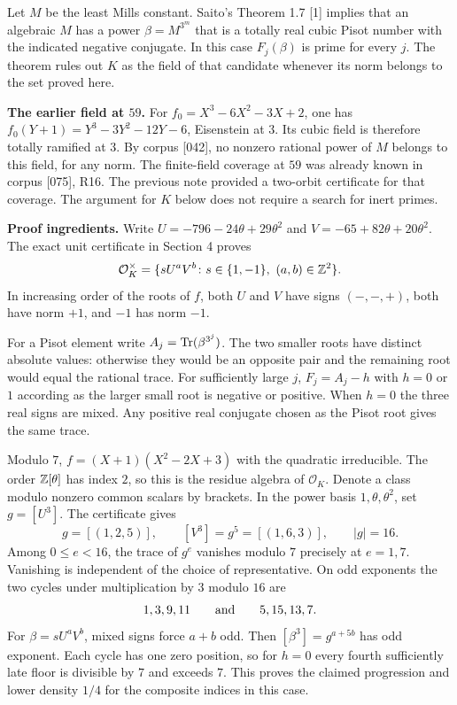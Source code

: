\documentclass[11pt,a4paper,oneside,openany]{book}
\begin{document}
Let $M$ be the least Mills constant. Saito's Theorem 1.7 [1] implies that an algebraic $M$ has a power $\beta=M^{3^m}$ that is a totally real cubic Pisot number with the indicated negative conjugate. In this case $F_j(\beta)$ is prime for every $j$. The theorem rules out $K$ as the field of that candidate whenever its norm belongs to the set proved here.

\textbf{The earlier field at $59$.} For $f_0=X^3-6X^2-3X+2$, one has $f_0(Y+1)=Y^3-3Y^2-12Y-6$, Eisenstein at $3$. Its cubic field is therefore totally ramified at $3$. By corpus [042], no nonzero rational power of $M$ belongs to this field, for any norm. The finite-field coverage at $59$ was already known in corpus [075], R16. The previous note provided a two-orbit certificate for that coverage. The argument for $K$ below does not require a search for inert primes.

\textbf{Proof ingredients.} Write $U=-796-24\theta+29\theta^2$ and $V=-65+82\theta+20\theta^2$. The exact unit certificate in Section 4 proves
\[
 \mathcal O_K^\times=\{sU^aV^b\colon s\in\{1,-1\},\ (a,b)\in\mathbb Z^2\}.
\]
In increasing order of the roots of $f$, both $U$ and $V$ have signs $(-,-,+)$, both have norm $+1$, and $-1$ has norm $-1$.



For a Pisot element write $A_j=\operatorname{Tr}(\beta^{3^j})$. The two smaller roots have distinct absolute values: otherwise they would be an opposite pair and the remaining root would equal the rational trace. For sufficiently large $j$, $F_j=A_j-h$ with $h=0$ or $1$ according as the larger small root is negative or positive. When $h=0$ the three real signs are mixed. Any positive real conjugate chosen as the Pisot root gives the same trace.

Modulo $7$, $f=(X+1)(X^2-2X+3)$ with the quadratic irreducible. The order $\mathbb Z[\theta]$ has index $2$, so this is the residue algebra of $\mathcal O_K$. Denote a class modulo nonzero common scalars by brackets. In the power basis $1,\theta,\theta^2$, set $g=[U^3]$. The certificate gives
\[
 g=[(1,2,5)],\qquad [V^3]=g^5=[(1,6,3)],\qquad
 |g|=16 .
\]
Among $0\le e<16$, the trace of $g^e$ vanishes modulo $7$ precisely at $e=1,7$. Vanishing is independent of the choice of representative. On odd exponents the two cycles under multiplication by $3$ modulo $16$ are
\[
 1,3,9,11\qquad\hbox{and}\qquad 5,15,13,7 .
\]
For $\beta=sU^aV^b$, mixed signs force $a+b$ odd. Then $[\beta^3]=g^{a+5b}$ has odd exponent. Each cycle has one zero position, so for $h=0$ every fourth sufficiently late floor is divisible by $7$ and exceeds $7$. This proves the claimed progression and lower density $1/4$ for the composite indices in this case.
\end{document}

